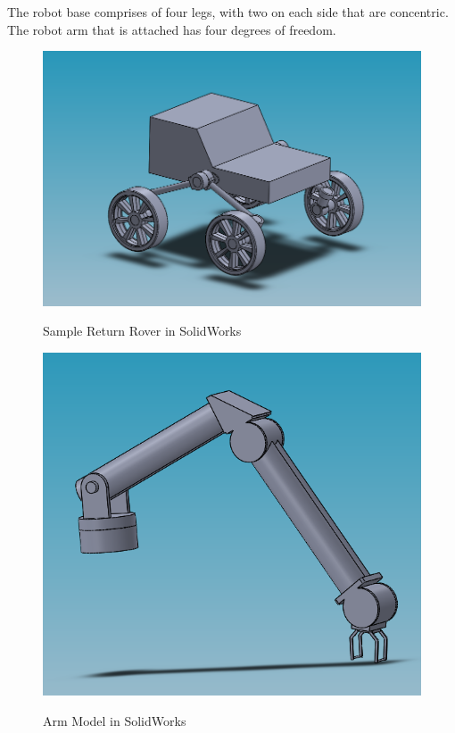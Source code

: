 The robot base comprises of four legs, with two on each side that are concentric. The robot arm that is attached has four degrees of freedom.


\begin{figure}[htb]
	\centering
	\includegraphics[scale=0.70]{sections/robot-design/images/SRR_model.png}
	\label{sample_return_rover:robot_design:srr_cad}
	\caption{Sample Return Rover in SolidWorks}
\end{figure}



\begin{figure}[htb]
	\centering
	\includegraphics[scale=0.70]{sections/robot-design/images/arm_model.png}
	\label{sample_return_rover:robot_design:arm_side.png}
	\caption{Arm Model in SolidWorks}
\end{figure}


